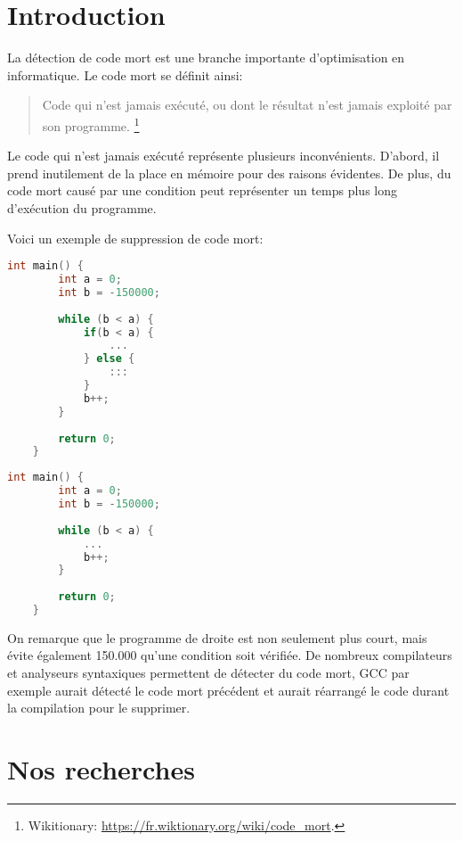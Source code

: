 \section{Introduction}
La détection de code mort est une branche importante d'optimisation en informatique. Le code mort se définit ainsi:
\begin{quotation}
    Code qui n'est jamais exécuté, ou dont le résultat n'est jamais exploité par son programme.
    \footnote{Wikitionary: \url{https://fr.wiktionary.org/wiki/code_mort}.}
\end{quotation}
Le code qui n'est jamais exécuté représente plusieurs inconvénients. D'abord, il prend inutilement de la place en mémoire pour des raisons évidentes. De plus, du code mort causé par une condition peut représenter un temps plus long d'exécution du programme.

Voici un exemple de suppression de code mort:
\begin{multicols}{2}
\begin{lstlisting}[language=c]
    int main() {
        int a = 0;
        int b = -150000;
        
        while (b < a) {
            if(b < a) {
                ...
            } else {
                :::
            }
            b++;
        }
    
        return 0;
    }
\end{lstlisting}
\columnbreak
\begin{lstlisting}[language=c]
    int main() {
        int a = 0;
        int b = -150000;
        
        while (b < a) {
            ...
            b++;
        }
    
        return 0;
    }
\end{lstlisting}
\end{multicols}
\begin{center}
\end{center}

On remarque que le programme de droite est non seulement plus court, mais évite également 150.000 qu'une condition soit vérifiée. De nombreux compilateurs et analyseurs syntaxiques permettent de détecter du code mort, GCC par exemple aurait détecté le code mort précédent et aurait réarrangé le code durant la compilation pour le supprimer.

\section{Nos recherches}
